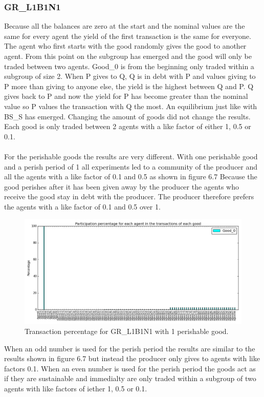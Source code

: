 \documentclass[twoside,openright]{uva-bachelor-thesis}
\begin{document}
\subsubsection{GR\_L1B1N1}
Because all the balances are zero at the start and the nominal values are the same for every agent the yield of the first transaction is the same for everyone. The agent who first starts with the good randomly gives the good to another agent. From this point on the subgroup has emerged and the good will only be traded between two agents. Good\_0 is from the beginning only traded within a subgroup of size 2.  When P gives to Q, Q is in debt with P and values giving to P more than giving to anyone else, the yield is the highest between Q and P. Q gives back to P and now the yield for P has become greater than the nominal value so P values the transaction with Q the most. An equilibrium just like with BS\_S has emerged. Changing the amount of goods did not change the results. Each good is only traded between 2 agents with a like factor of either 1, 0.5 or 0.1.
\\
\\
For the perishable goods the results are very different. With one perishable good and a perish period of 1 all experiments led to a community of the producer and all the agents with a like factor of 0.1 and 0.5 as shown in figure 6.7 Because the good perishes after it has been given away by the producer the agents who receive the good stay in debt with the producer. The producer therefore prefers the agents with a like factor of 0.1 and 0.5 over 1. \\
\begin{figure}[h!]
  \centering
   \includegraphics[scale=0.4]{Simulation_figures/GR_L1B1N1/1perishable_1-1_15k}
  \caption{Transaction percentage for GR\_L1B1N1 with 1 perishable good.}
\end{figure}

When an odd number is used for the perish period the results are similar to the results shown in figure 6.7 but instead the producer only gives to agents with like factors 0.1. When an even number is used for the perish period the goods act as if they are sustainable and immedialty are only traded within a subgroup of two agents with like factors of iether 1, 0.5 or 0.1. 
\end{document}
